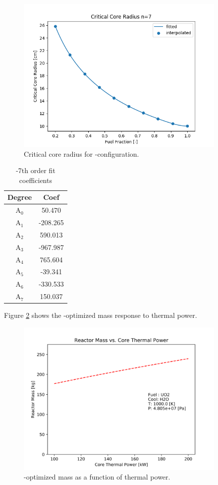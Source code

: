 \begin{figure}[h]
    \centering
    \includegraphics[width=4in]{../images/core_r_uo2_h2o.png}
\caption{Critical core radius for \uox-\water configuration.}
\label{fig:core_r_uo2_h2o}
\end{figure}

\begin{table}[h]
  \centering
  \caption{\uox-\water 7th order fit coefficients}
  \begin{tabular}{cc}
    \toprule
     Degree & Coef\\ 
    \midrule                                  
    A$_0$  &  50.470\\
    A$_1$  &  -208.265\\
    A$_2$  &  590.013\\
    A$_3$  &  -967.987\\
    A$_4$  &  765.604\\
    A$_5$  &  -39.341\\
    A$_6$  &  -330.533\\
    A$_7$  &  150.037\\
  \end{tabular}
  \label{tab:uo2_h2o_fit_coeffs}
\end{table}

Figure \ref{fig:mass_uo2_h2o} shows the \uox-\water optimized mass response to thermal
power.

\begin{figure}[h]
    \centering
    \includegraphics[width=4in]{../images/mass_vs_q_uo2_h2o.png}
\caption{\uox-\codiox optimized mass as a function of thermal power.}
\label{fig:mass_uo2_h2o}
\end{figure}


